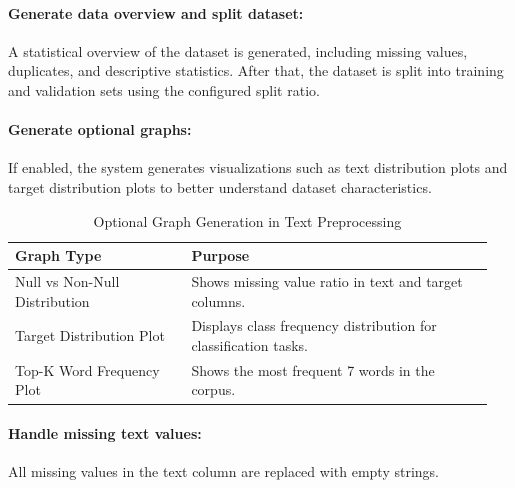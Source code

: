 \paragraph{Generate data overview and split dataset:}\par
A statistical overview of the dataset is generated, including missing values, duplicates, and descriptive statistics. After that, the dataset is split into training and validation sets using the configured split ratio.
\vspace{1cm}
\paragraph{Generate optional graphs:}\par
If enabled, the system generates visualizations such as text distribution plots and target distribution plots to better understand dataset characteristics.
\vspace{0.5cm}

\begin{table}[!htbp]
\centering
\caption{Optional Graph Generation in Text Preprocessing}
\begin{tabular}{p{0.35\linewidth}p{0.60\linewidth}}
\toprule
\textbf{Graph Type} & \textbf{Purpose} \\
\midrule

Null vs Non-Null Distribution &
Shows missing value ratio in text and target columns. \\

Target Distribution Plot &
Displays class frequency distribution for classification tasks. \\

Top-K Word Frequency Plot &
Shows the most frequent 7 words in the corpus.\\

\bottomrule
\end{tabular}
\end{table}
\vspace{1cm}
\paragraph{Handle missing text values:}\par
All missing values in the text column are replaced with empty strings.
\vspace{1cm}
